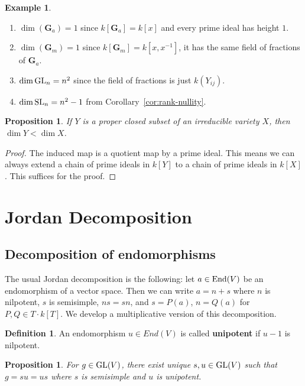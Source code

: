 \documentclass[]{pcmi}
\theoremstyle{plain}
\newtheorem{Proposition}[equation]{Proposition}
\theoremstyle{definition}
\newtheorem{Definition}[equation]{Definition}
\newtheorem{Example}[equation]{Example}
\begin{document}
\begin{Example}
    \phantom{h}
    \begin{enumerate}
        \item $\dim (\mathbf{G}_a) = 1$ since $k[\mathbf{G}_a] = k[x]$ and every prime ideal has height $1$. 
        \item $\dim (\mathbf{G}_m) = 1$ since $k[\mathbf{G}_m] = k[x, x^{-1}]$, it has the same field of fractions of $\mathbf{G}_a$. 
        \item $\dim \operatorname{GL}_n = n^2$ since the field of fractions is just $k(Y_{ij})$. 
        \item $\dim \operatorname{SL}_n = n^2 - 1$ from Corollary~\ref{cor:rank-nullity}. 
    \end{enumerate}
\end{Example}

\begin{Proposition}
    If $Y$ is a proper closed subset of an irreducible variety $X$, then $\dim Y < \dim X$. 
\end{Proposition}

\begin{proof}
    The induced map is a quotient map by a prime ideal. This means we can always extend a chain of prime ideals in $k[Y]$ to a chain of prime ideals in $k[X]$. This suffices for the proof. 
\end{proof}

\section{Jordan Decomposition}

\subsection{Decomposition of endomorphisms}

The usual Jordan decomposition is the following: let $a \in \operatorname{End}(V)$ be an endomorphism of a vector space. Then we can write $a = n + s$ where $n$ is nilpotent, $s$ is semisimple, $ns = sn$, and $s = P(a)$, $n = Q(a)$ for $P, Q \in T \cdot k[T]$. We develop a multiplicative version of this decomposition. 

\begin{Definition}
    An endomorphism $u \in End(V)$ is called \textbf{unipotent} if $u - 1$ is nilpotent. 
\end{Definition}

\begin{Proposition}
    For $g \in \operatorname{GL}(V)$, there exist unique $s, u \in \operatorname{GL}(V)$ such that $g = su = us$ where $s$ is semisimple and $u$ is unipotent. 
\end{Proposition}
\end{document}
